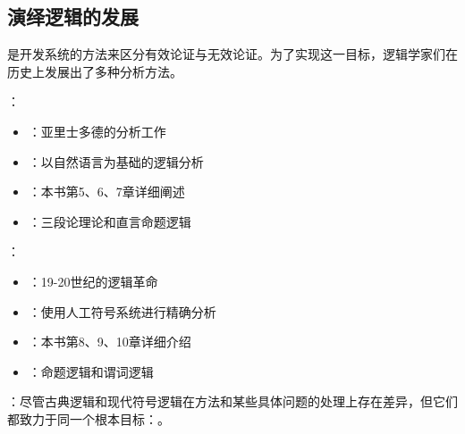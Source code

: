 \subsection{演绎逻辑的发展}

是开发系统的方法来区分有效论证与无效论证。为了实现这一目标，逻辑学家们在历史上发展出了多种分析方法。

\begin{theorembox}[title=逻辑学的两大传统]
：
\begin{itemize}
  \item {}：亚里士多德的分析工作
  \item {}：以自然语言为基础的逻辑分析
  \item {}：本书第5、6、7章详细阐述
  \item {}：三段论理论和直言命题逻辑
\end{itemize}

：
\begin{itemize}
  \item {}：19-20世纪的逻辑革命
  \item {}：使用人工符号系统进行精确分析
  \item {}：本书第8、9、10章详细介绍
  \item {}：命题逻辑和谓词逻辑
\end{itemize}
\end{theorembox}

：尽管古典逻辑和现代符号逻辑在方法和某些具体问题的处理上存在差异，但它们都致力于同一个根本目标：。

